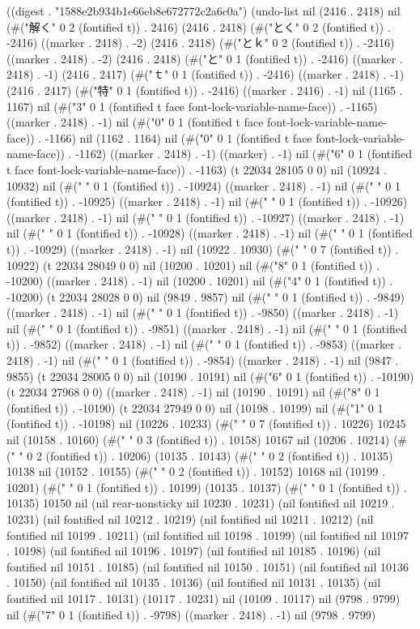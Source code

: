 
((digest . "1588e2b934b1e66eb8e672772c2a6c0a") (undo-list nil (2416 . 2418) nil (#("解く" 0 2 (fontified t)) . 2416) (2416 . 2418) (#("とく" 0 2 (fontified t)) . -2416) ((marker . 2418) . -2) (2416 . 2418) (#("とｋ" 0 2 (fontified t)) . -2416) ((marker . 2418) . -2) (2416 . 2418) (#("と" 0 1 (fontified t)) . -2416) ((marker . 2418) . -1) (2416 . 2417) (#("ｔ" 0 1 (fontified t)) . -2416) ((marker . 2418) . -1) (2416 . 2417) (#("特" 0 1 (fontified t)) . -2416) ((marker . 2416) . -1) nil (1165 . 1167) nil (#("3" 0 1 (fontified t face font-lock-variable-name-face)) . -1165) ((marker . 2418) . -1) nil (#("0" 0 1 (fontified t face font-lock-variable-name-face)) . -1166) nil (1162 . 1164) nil (#("0" 0 1 (fontified t face font-lock-variable-name-face)) . -1162) ((marker . 2418) . -1) ((marker) . -1) nil (#("6" 0 1 (fontified t face font-lock-variable-name-face)) . -1163) (t 22034 28105 0 0) nil (10924 . 10932) nil (#(" " 0 1 (fontified t)) . -10924) ((marker . 2418) . -1) nil (#(" " 0 1 (fontified t)) . -10925) ((marker . 2418) . -1) nil (#(" " 0 1 (fontified t)) . -10926) ((marker . 2418) . -1) nil (#(" " 0 1 (fontified t)) . -10927) ((marker . 2418) . -1) nil (#(" " 0 1 (fontified t)) . -10928) ((marker . 2418) . -1) nil (#(" " 0 1 (fontified t)) . -10929) ((marker . 2418) . -1) nil (10922 . 10930) (#("       " 0 7 (fontified t)) . 10922) (t 22034 28049 0 0) nil (10200 . 10201) nil (#("8" 0 1 (fontified t)) . -10200) ((marker . 2418) . -1) nil (10200 . 10201) nil (#("4" 0 1 (fontified t)) . -10200) (t 22034 28028 0 0) nil (9849 . 9857) nil (#(" " 0 1 (fontified t)) . -9849) ((marker . 2418) . -1) nil (#(" " 0 1 (fontified t)) . -9850) ((marker . 2418) . -1) nil (#(" " 0 1 (fontified t)) . -9851) ((marker . 2418) . -1) nil (#(" " 0 1 (fontified t)) . -9852) ((marker . 2418) . -1) nil (#(" " 0 1 (fontified t)) . -9853) ((marker . 2418) . -1) nil (#(" " 0 1 (fontified t)) . -9854) ((marker . 2418) . -1) nil (9847 . 9855) (t 22034 28005 0 0) nil (10190 . 10191) nil (#("6" 0 1 (fontified t)) . -10190) (t 22034 27968 0 0) ((marker . 2418) . -1) nil (10190 . 10191) nil (#("8" 0 1 (fontified t)) . -10190) (t 22034 27949 0 0) nil (10198 . 10199) nil (#("1" 0 1 (fontified t)) . -10198) nil (10226 . 10233) (#("       " 0 7 (fontified t)) . 10226) 10245 nil (10158 . 10160) (#("	  " 0 3 (fontified t)) . 10158) 10167 nil (10206 . 10214) (#("	 " 0 2 (fontified t)) . 10206) (10135 . 10143) (#("	 " 0 2 (fontified t)) . 10135) 10138 nil (10152 . 10155) (#("	 " 0 2 (fontified t)) . 10152) 10168 nil (10199 . 10201) (#("	" 0 1 (fontified t)) . 10199) (10135 . 10137) (#("	" 0 1 (fontified t)) . 10135) 10150 nil (nil rear-nonsticky nil 10230 . 10231) (nil fontified nil 10219 . 10231) (nil fontified nil 10212 . 10219) (nil fontified nil 10211 . 10212) (nil fontified nil 10199 . 10211) (nil fontified nil 10198 . 10199) (nil fontified nil 10197 . 10198) (nil fontified nil 10196 . 10197) (nil fontified nil 10185 . 10196) (nil fontified nil 10151 . 10185) (nil fontified nil 10150 . 10151) (nil fontified nil 10136 . 10150) (nil fontified nil 10135 . 10136) (nil fontified nil 10131 . 10135) (nil fontified nil 10117 . 10131) (10117 . 10231) nil (10109 . 10117) nil (9798 . 9799) nil (#("7" 0 1 (fontified t)) . -9798) ((marker . 2418) . -1) nil (9798 . 9799) 